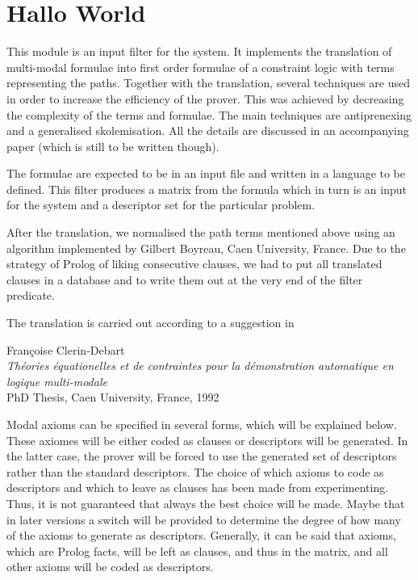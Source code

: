 \chapter{Hallo World}

This module is an input filter for the \ProCom{} system. It implements the
translation of multi-modal formulae into first order formulae of a
constraint logic with terms representing the paths. Together with the
translation, several techniques are used in order to increase the efficiency
of the prover. This was achieved by decreasing the complexity of the terms
and formulae. The main techniques are antiprenexing and a generalised
skolemisation. All the details are discussed in an accompanying paper
(which is still to be written though).

The formulae are expected to be in an input file and written in a language
to be defined. This filter produces a matrix from the formula which in turn
is an input for the \ProCom{} system and a descriptor set for the particular
problem.
 
After the translation, we normalised the path terms mentioned above using
an algorithm implemented by Gilbert Boyreau, Caen University, France.
Due to the strategy of Prolog of liking consecutive clauses, we had to
put all translated clauses in a database and to write them out at the very
end of the filter predicate.

The translation is carried out according to a suggestion in

\begin{center}
Fran\c{c}oise Clerin-Debart\\
{\em Th\'eories \'equationelles et de contraintes pour la d\'emonstration
automatique en logique multi-modale}\\
PhD Thesis, Caen University, France, 1992
\end{center}

Modal axioms can be specified in several forms, which will be explained below.
These axiomes will be either coded as clauses or descriptors will be generated.
In the latter case, the prover will be forced to use the generated set of
descriptors rather than the standard descriptors. The choice of which axioms
to code as descriptors and which to leave as clauses has been made from
experimenting. Thus, it is not guaranteed that always the best choice will
be made. Maybe that in later versions a switch will be provided to determine
the degree of how many of the axioms to generate as descriptors.
Generally, it can be said that axioms, which are Prolog facts, will be left
as clauses, and thus in the matrix, and all other axioms will be coded as
descriptors.

